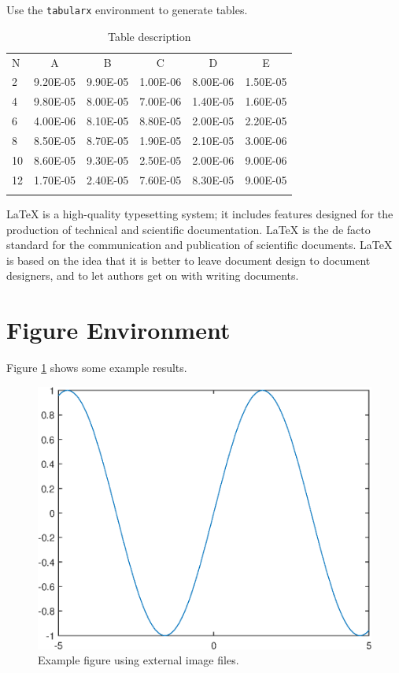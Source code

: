 \documentclass[openany,twoside,12pt]{book}
\theoremstyle{plain}
\numberwithin{equation}{chapter}
\numberwithin{figure}{chapter}
\numberwithin{table}{chapter}
\begin{document}
\clearpage
Use the \texttt{tabularx} environment to generate tables.

\begin{table}[htp!]
\centering
\renewcommand\arraystretch{1.2}
\caption{Table description}
\label{tab:error}
\begin{tabularx}{0.8\textwidth}{|P{0.8cm}|C|C|C|C|C|}
\Xhline{2\arrayrulewidth}
N  & A       & B    & C       & D      & E     \\
\Xhline{2\arrayrulewidth}
2  & 9.20E-05 & 9.90E-05 & 1.00E-06 & 8.00E-06 & 1.50E-05 \\
4  & 9.80E-05 & 8.00E-05 & 7.00E-06 & 1.40E-05 & 1.60E-05 \\
6  & 4.00E-06 & 8.10E-05 & 8.80E-05 & 2.00E-05 & 2.20E-05 \\
8  & 8.50E-05 & 8.70E-05 & 1.90E-05 & 2.10E-05 & 3.00E-06 \\
10 & 8.60E-05 & 9.30E-05 & 2.50E-05 & 2.00E-06 & 9.00E-06 \\
12 & 1.70E-05 & 2.40E-05 & 7.60E-05 & 8.30E-05 & 9.00E-05 \\
\Xhline{2\arrayrulewidth}
\end{tabularx}
\end{table}

LaTeX is a high-quality typesetting system; it includes features designed
for the production of technical and scientific documentation.
LaTeX is the de facto standard for the communication and publication of scientific documents.
LaTeX is based on the idea that it is better to leave document design to
document designers, and to let authors get on with writing documents.


\section{Figure Environment}

Figure \ref{fig:a} shows some example results.
\begin{figure}[htp!]
  \centering
  \includegraphics[width=0.48\linewidth]{image1}
  \caption{Example figure using external image files.}
  \label{fig:a}
\end{figure}
\end{document}
